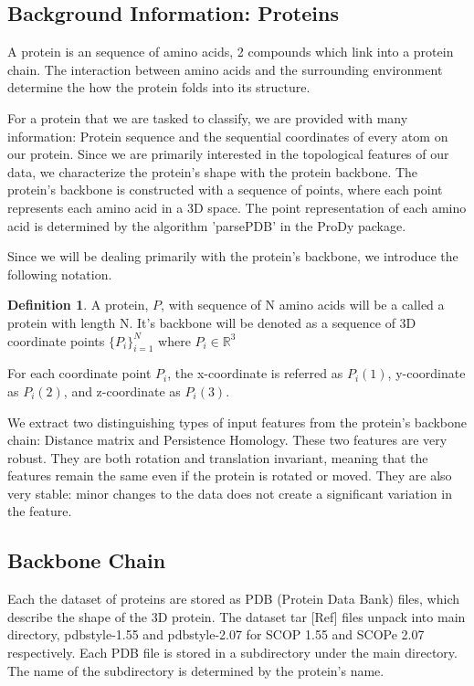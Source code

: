 \documentclass[12pt, a4paper, twocolumn, fullpage]{article}
\theoremstyle{plain}
\theoremstyle{definition}
\newtheorem{defn}{Definition}[section]
\theoremstyle{remark}
\begin{document}
\subsection{ Background Information: Proteins} \label{Background Information: Proteins}
A protein is an sequence of amino acids, 2 compounds which link into a protein chain. The interaction between amino acids and the surrounding environment determine the how the protein folds into its structure.

For a protein that we are tasked to classify, we are provided with many information: Protein sequence and the sequential coordinates of every atom on our protein. Since we are primarily interested in the topological features of our data, we characterize the protein's shape with the protein backbone. The protein's backbone is constructed with a sequence of points, where each point represents each amino acid in a 3D space. The point representation of each amino acid is determined by the algorithm 'parsePDB' in the ProDy package. 

Since we will be dealing primarily with the protein's backbone, we introduce the following notation.
    
\begin{defn}
A protein, $P$, with sequence of N amino acids will be a called a protein with length N. It's backbone will be denoted as a sequence of 3D coordinate points $ \{P_i\}^{N}_{i=1} $ where $P_{i} \in \mathbb{R}^3 $

For each coordinate point $ P_{i} $, the x-coordinate is referred as $ P_{i}(1) $, y-coordinate as $ P_{i}(2) $, and z-coordinate as $ P_{i}(3) $.
\end{defn}

We extract two distinguishing types of input features from the protein's backbone chain: Distance matrix and Persistence Homology. These two features are very robust. They are both rotation and translation invariant, meaning that the features remain the same even if the protein is rotated or moved. They are also very stable: minor changes to the data does not create a significant variation in the feature.
    
\subsection{ Backbone Chain}
Each the dataset of proteins are stored as PDB (Protein Data Bank) files, which describe the shape of the 3D protein. The dataset tar [Ref] files unpack into main directory, pdbstyle-1.55 and pdbstyle-2.07 for SCOP 1.55 and SCOPe 2.07 respectively. Each PDB file is stored in a subdirectory under the main directory. The name of the subdirectory is determined by the protein's name.
\end{document}
